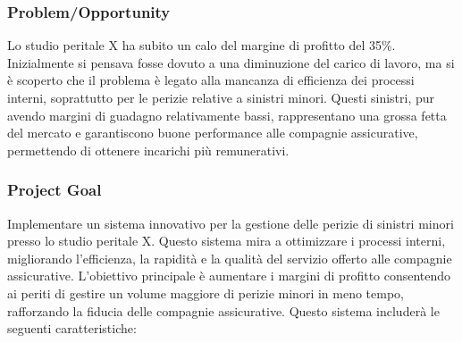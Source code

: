 \documentclass[a4paper,12pt, openright]{report}
\begin{document}
\subsubsection{Problem/Opportunity}
Lo studio peritale X ha subito un calo del margine di profitto del 35\%. Inizialmente si pensava fosse dovuto a una diminuzione del carico di lavoro, ma si è scoperto che il problema è legato alla mancanza di efficienza dei processi interni, soprattutto per le perizie relative a sinistri minori. Questi sinistri, pur avendo margini di guadagno relativamente bassi, rappresentano una grossa fetta del mercato e garantiscono buone performance alle compagnie assicurative, permettendo di ottenere incarichi più remunerativi.

\subsubsection{Project Goal}
Implementare un sistema innovativo per la gestione delle perizie di sinistri minori presso lo studio peritale X. Questo sistema mira a ottimizzare i processi interni, migliorando l'efficienza, la rapidità e la qualità del servizio offerto alle compagnie assicurative. L'obiettivo principale è aumentare i margini di profitto consentendo ai periti di gestire un volume maggiore di perizie minori in meno tempo, rafforzando la fiducia delle compagnie assicurative. Questo sistema includerà le seguenti caratteristiche:
\end{document}
